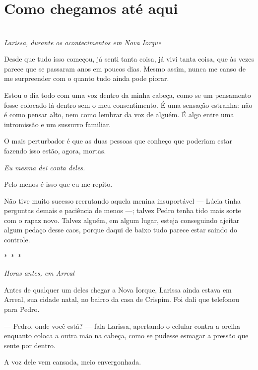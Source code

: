 \newpage
\ifdefined\useChapters
\chapter{Como chegamos até aqui}
\else
\chapter{}
\fi

\begin{center}
\textit{Larissa, durante os acontecimentos em Nova Iorque}
\end{center}

Desde que tudo isso começou, já senti tanta coisa, já vivi tanta coisa, que às vezes parece que se passaram anos em poucos dias. Mesmo assim, nunca me canso de me surpreender com o quanto tudo ainda pode piorar.

Estou o dia todo com uma voz dentro da minha cabeça, como se um pensamento fosse colocado lá dentro sem o meu consentimento. É uma sensação estranha: não é como pensar alto, nem como lembrar da voz de alguém. É algo entre uma intromissão e um sussurro familiar.

O mais perturbador é que as duas pessoas que conheço que poderiam estar fazendo isso estão, agora, mortas.

\emph{Eu mesma dei conta deles.}

Pelo menos é isso que eu me repito.

Não tive muito sucesso recrutando aquela menina insuportável — Lúcia tinha perguntas demais e paciência de menos —; talvez Pedro tenha tido mais sorte com o rapaz novo. Talvez alguém, em algum lugar, esteja conseguindo ajeitar algum pedaço desse caos, porque daqui de baixo tudo parece estar saindo do controle.

\begin{center}
$\ast$~$\ast$~$\ast$

\textit{Horas antes, em Arreal}
\end{center}

Antes de qualquer um deles chegar a Nova Iorque, Larissa ainda estava em Arreal, sua cidade natal, no bairro da casa de Crispim. Foi dali que telefonou para Pedro.

— Pedro, onde você está? — fala Larissa, apertando o celular contra a orelha enquanto coloca a outra mão na cabeça, como se pudesse esmagar a pressão que sente por dentro.

A voz dele vem cansada, meio envergonhada.

